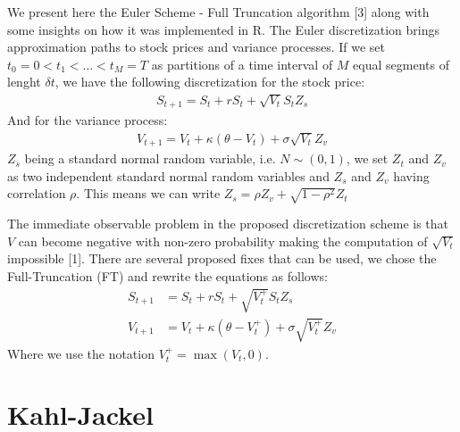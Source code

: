 \documentclass[12pt,twoside]{reedthesis}
\theoremstyle{definition}
\theoremstyle{definition}
\theoremstyle{remark}
\begin{document}
  We present here the Euler Scheme - Full Truncation algorithm {[}3{]}
  along with some insights on how it was implemented in R. The Euler
  discretization brings approximation paths to stock prices and variance
  processes. If we set \(t_0 = 0 < t_1 < \dots < t_M = T\) as partitions
  of a time interval of \(M\) equal segments of lenght \(\delta t\), we
  have the following discretization for the stock price:
  \begin{align}
  S_{t+1} = S_t + rS_t + \sqrt{V_t} S_t Z_s
  \end{align}
  \noindent
  And for the variance process:
  \begin{align}
  V_{t+1} = V_t + \kappa (\theta - V_t) + \sigma \sqrt{V_t} Z_v
  \end{align}
  \noindent
  \(Z_s\) being a standard normal random variable, i.e. \(N\sim(0,1)\), we
  set \(Z_t\) and \(Z_v\) as two independent standard normal random
  variables and \(Z_s\) and \(Z_v\) having correlation \(\rho\). This
  means we can write \(Z_s = \rho Z_v + \sqrt{1-\rho^2} Z_t\)
  
  The immediate observable problem in the proposed discretization scheme
  is that \(V\) can become negative with non-zero probability making the
  computation of \(\sqrt{V_t}\) impossible {[}1{]}. There are several
  proposed fixes that can be used, we chose the Full-Truncation (FT) and
  rewrite the equations as follows:
  \begin{align}
  S_{t+1} &= S_t + rS_t + \sqrt{V_{t}^{+}} S_t Z_s \\
  V_{t+1} &= V_t + \kappa (\theta - V_{t}^{+}) + \sigma \sqrt{V_{t}^{+}} Z_v
  \end{align}
  \noindent
  Where we use the notation \(V_{t}^{+} = \max(V_{t}, 0)\).
  
  \section{Kahl-Jackel}\label{kahl-jackel}
  
\end{document}
